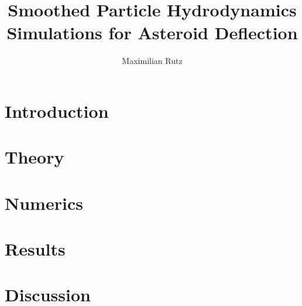 \documentclass{article}
\title{Smoothed Particle Hydrodynamics Simulations for Asteroid Deflection}
\author{Maximilian Rutz}
\date{}
\begin{document}
\maketitle
\begin{abstract}
   
\end{abstract}

\newpage
\tableofcontents

\newpage
\section{Introduction}

\newpage
\section{Theory}

\newpage
\section{Numerics}

\newpage
\section{Results}

\newpage
\section{Discussion}


\newpage
\printbibliography
\end{document}
